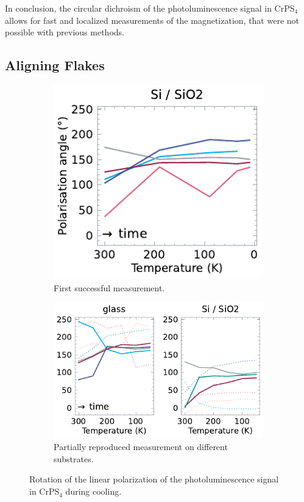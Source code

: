 \documentclass[
	twoside,
	parskip=half,
	a4paper,
]{scrbook}
\begin{document}
In conclusion, the circular dichroism of the photoluminescence signal in CrPS$_4$ allows for fast and localized measurements of the magnetization, that were not possible with previous methods.


\clearpage
\subsection{Aligning Flakes}
\label{sec:aligning flakes}
\begin{figure}
	\begin{subfigure}{2.5in}
		\includegraphics{../figures/2024-01-23 rotating pl.pdf}
		\caption{First successful measurement.}
		\label{fig:alignment first}
	\end{subfigure}
	\begin{subfigure}{3.5in}
		\includegraphics{../figures/2024-01-29 rotating pl.pdf}
		\caption{Partially reproduced measurement on different substrates.}
		\label{fig:alignment second}
	\end{subfigure}
	\caption{Rotation of the linear polarization of the photoluminescence signal in CrPS$_4$ during cooling.}
	\label{fig:alignment}
\end{figure}
\end{document}
